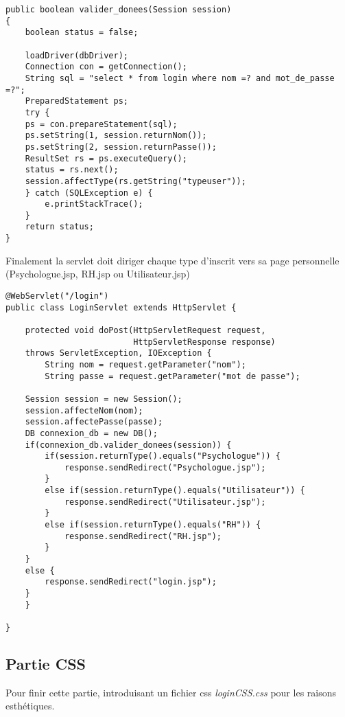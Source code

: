 \documentclass[12]{article}
\begin{document}
\begin{scriptsize}
\lstset{language=java}
\begin{lstlisting}
public boolean valider_donees(Session session)
{
	boolean status = false;

	loadDriver(dbDriver);
	Connection con = getConnection();
	String sql = "select * from login where nom =? and mot_de_passe =?";
	PreparedStatement ps;
	try {
	ps = con.prepareStatement(sql);
	ps.setString(1, session.returnNom());
	ps.setString(2, session.returnPasse());
	ResultSet rs = ps.executeQuery();
	status = rs.next();
	session.affectType(rs.getString("typeuser"));
	} catch (SQLException e) {
		e.printStackTrace();
	}
	return status;
}
\end{lstlisting}
\end{scriptsize}

\newpage

Finalement la servlet doit diriger chaque type d'inscrit vers sa page personnelle (Psychologue.jsp, RH.jsp ou Utilisateur.jsp)\\

\begin{scriptsize}
\lstset{language=java}
\begin{lstlisting}
@WebServlet("/login")
public class LoginServlet extends HttpServlet {
	
	protected void doPost(HttpServletRequest request, 
						  HttpServletResponse response) 
	throws ServletException, IOException {
		String nom = request.getParameter("nom");
		String passe = request.getParameter("mot de passe");
		
	Session session = new Session();
	session.affecteNom(nom);
	session.affectePasse(passe);
	DB connexion_db = new DB();
	if(connexion_db.valider_donees(session)) {
		if(session.returnType().equals("Psychologue")) {
			response.sendRedirect("Psychologue.jsp");
		}
		else if(session.returnType().equals("Utilisateur")) {
			response.sendRedirect("Utilisateur.jsp");
		}
		else if(session.returnType().equals("RH")) {
			response.sendRedirect("RH.jsp");
		}
	}
	else {
		response.sendRedirect("login.jsp");
	}
	}

}
\end{lstlisting}
\end{scriptsize}


\subsection{Partie CSS}

Pour finir cette partie, introduisant un fichier css \textit{loginCSS.css} pour les raisons esthétiques.\\
\end{document}
